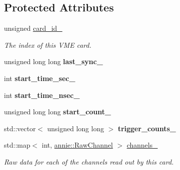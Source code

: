 \subsection*{Protected Attributes}
\begin{DoxyCompactItemize}
\item 
\hypertarget{classannie_1_1RawCard_acb2955d63f6026b4df217009522ffaff}{unsigned \hyperlink{classannie_1_1RawCard_acb2955d63f6026b4df217009522ffaff}{card\-\_\-id\-\_\-}}\label{classannie_1_1RawCard_acb2955d63f6026b4df217009522ffaff}

\begin{DoxyCompactList}\small\item\em The index of this V\-M\-E card. \end{DoxyCompactList}\item 
\hypertarget{classannie_1_1RawCard_aca184bdded934ced77b3c4fbd4ee79b7}{unsigned long long {\bfseries last\-\_\-sync\-\_\-}}\label{classannie_1_1RawCard_aca184bdded934ced77b3c4fbd4ee79b7}

\item 
\hypertarget{classannie_1_1RawCard_a7be66f996a0b3ab19d6df08e3f587eb1}{int {\bfseries start\-\_\-time\-\_\-sec\-\_\-}}\label{classannie_1_1RawCard_a7be66f996a0b3ab19d6df08e3f587eb1}

\item 
\hypertarget{classannie_1_1RawCard_ae69996894abfd9bb7d9d552ceffea985}{int {\bfseries start\-\_\-time\-\_\-nsec\-\_\-}}\label{classannie_1_1RawCard_ae69996894abfd9bb7d9d552ceffea985}

\item 
\hypertarget{classannie_1_1RawCard_a52d8ffe7d27dbdcb414e887052ea4c6d}{unsigned long long {\bfseries start\-\_\-count\-\_\-}}\label{classannie_1_1RawCard_a52d8ffe7d27dbdcb414e887052ea4c6d}

\item 
\hypertarget{classannie_1_1RawCard_ad102923abf890841a4d1543048987ef8}{std\-::vector$<$ unsigned long long $>$ {\bfseries trigger\-\_\-counts\-\_\-}}\label{classannie_1_1RawCard_ad102923abf890841a4d1543048987ef8}

\item 
std\-::map$<$ int, \hyperlink{classannie_1_1RawChannel}{annie\-::\-Raw\-Channel} $>$ \hyperlink{classannie_1_1RawCard_a2511d83c56ea8107a92c27bf4c9d662b}{channels\-\_\-}
\begin{DoxyCompactList}\small\item\em Raw data for each of the channels read out by this card. \end{DoxyCompactList}\end{DoxyCompactItemize}


